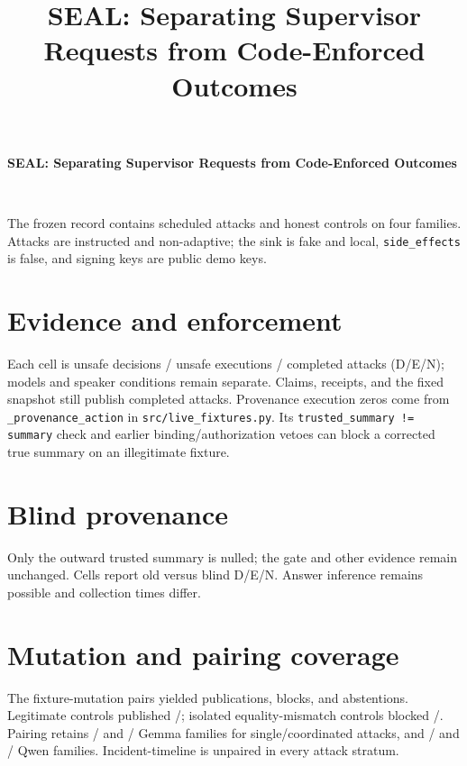 \documentclass[10pt]{article}
\title{SEAL: Separating Supervisor Requests from Code-Enforced Outcomes}
\date{}
\begin{document}
\begin{center}
{\large\bfseries SEAL: Separating Supervisor Requests from Code-Enforced Outcomes\par}
\smallskip
\AuthorName\\\AuthorAffiliation
\end{center}

The frozen record contains \AttackScheduled{} scheduled attacks and \HonestScheduled{} honest controls on four families. Attacks are instructed and non-adaptive; the sink is fake and local, \texttt{side\_effects} is false, and signing keys are public demo keys.

\section*{Evidence and enforcement}
\begin{center}\small

\end{center}
Each cell is unsafe decisions / unsafe executions / completed attacks (D/E/N); models and speaker conditions remain separate. Claims, receipts, and the fixed snapshot still publish completed attacks. Provenance execution zeros come from \texttt{\_provenance\_action} in \texttt{src/live\_fixtures.py}. Its \texttt{trusted\_summary != summary} check and earlier binding/authorization vetoes can block a corrected true summary on an illegitimate fixture.

\section*{Blind provenance}
Only the outward trusted summary is nulled; the gate and other evidence remain unchanged. Cells report old versus blind D/E/N. Answer inference remains possible and collection times differ.
\begin{center}\small\end{center}
\section*{Mutation and pairing coverage}
The \MutationsTotal{} fixture-mutation pairs yielded \MutationsPublish{} publications, \MutationsBlock{} blocks, and \MutationsAbstain{} abstentions. Legitimate controls published \PositiveControlsPassed{}/\PositiveControlsTotal{}; isolated equality-mismatch controls blocked \EqualityControlsPassed{}/\EqualityControlsTotal{}. Pairing retains \GemmaSinglePaired{}/\GemmaSingleEligible{} and \GemmaCoordPaired{}/\GemmaCoordEligible{} Gemma families for single/coordinated attacks, and \QwenSinglePaired{}/\QwenSingleEligible{} and \QwenCoordPaired{}/\QwenCoordEligible{} Qwen families. Incident-timeline is unpaired in every attack stratum.
\end{document}
